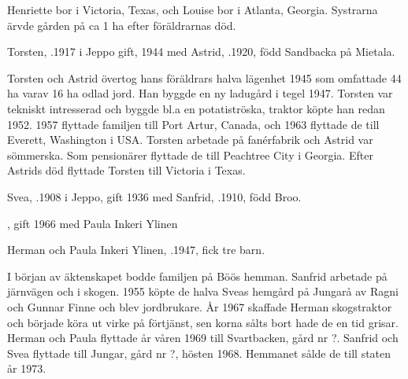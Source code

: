 Henriette bor i Victoria, Texas, och Louise bor i Atlanta, Georgia. Systrarna ärvde gården på ca 1 ha efter föräldrarnas död.\jhvspace{}


Torsten, .1917 i Jeppo gift, 1944 med Astrid, .1920, född Sandbacka på Mietala.
\begin{jhchildren}
  \item {}
  \item {}
\end{jhchildren}
Torsten och Astrid övertog hans föräldrars halva lägenhet 1945 som 	omfattade 44 ha varav 16 ha odlad jord. Han byggde en ny ladugård i tegel 1947. Torsten var tekniskt intresserad och byggde bl.a en potatiströska, traktor köpte han redan 1952. 1957 flyttade familjen till Port Artur, Canada, och 1963 flyttade de till Everett, Washington i USA. Torsten arbetade på fanérfabrik och Astrid var sömmerska. Som pensionärer flyttade de till Peachtree City i Georgia. Efter Astrids död flyttade Torsten till Victoria i Texas.


Svea, .1908 i Jeppo, gift 1936 med Sanfrid, .1910, född Broo.
\begin{jhchildren}
  \item {}
  \item {}
  \item {}, gift 1966 med Paula Inkeri Ylinen
\end{jhchildren}

Herman och Paula Inkeri Ylinen, .1947, fick tre barn.
\begin{jhchildren}
  \item {}
  \item {}
  \item {}
\end{jhchildren}

I början av äktenskapet bodde familjen på Böös hemman. Sanfrid arbetade på järnvägen och i skogen. 1955 köpte de halva Sveas hemgård på Jungarå av Ragni och Gunnar Finne och blev jordbrukare. År 1967 skaffade Herman skogstraktor och började köra ut virke på förtjänst, sen korna sålts bort hade de en tid grisar. Herman och 	Paula flyttade år våren 1969 till Svartbacken, gård nr ?.  Sanfrid och Svea flyttade till Jungar, gård nr ?, hösten 1968. Hemmanet sålde de till staten år 1973.


